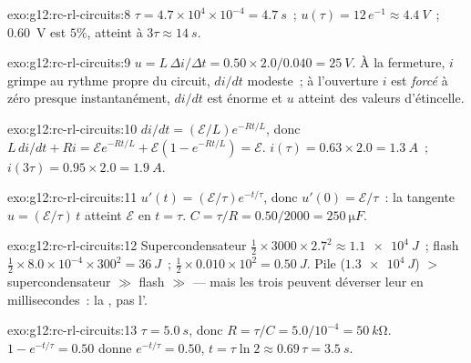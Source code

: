 \begin{solution}{exo:g12:rc-rl-circuits:8}
$\tau = 4.7\times10^{4} \times 10^{-4} = \qty{4.7}{s}$~;
$u(\tau) = 12\,e^{-1} \approx \qty{4.4}{V}$~; \qty{0.60}{V} est
$5\%$, atteint à $3\tau \approx \qty{14}{s}$.
\end{solution}

\begin{solution}{exo:g12:rc-rl-circuits:9}
$u = L\,\Delta i/\Delta t = 0.50 \times 2.0/0.040 = \qty{25}{V}$.
À la fermeture, $i$ grimpe au rythme propre du circuit, $di/dt$
modeste~; à l'ouverture $i$ est \emph{forcé} à zéro
presque instantanément, $di/dt$ est énorme et $u$ atteint des valeurs
d'étincelle.
\end{solution}

\begin{solution}{exo:g12:rc-rl-circuits:10}
$di/dt = (\mathcal{E}/L)e^{-Rt/L}$, donc $L\,di/dt + Ri =
\mathcal{E}e^{-Rt/L} + \mathcal{E}(1 - e^{-Rt/L}) = \mathcal{E}$.
$i(\tau) = 0.63 \times 2.0 = \qty{1.3}{A}$~;
$i(3\tau) = 0.95 \times 2.0 = \qty{1.9}{A}$.
\end{solution}

\begin{solution}{exo:g12:rc-rl-circuits:11}
$u'(t) = (\mathcal{E}/\tau)e^{-t/\tau}$, donc $u'(0) = \mathcal{E}/\tau$~:
la tangente $u = (\mathcal{E}/\tau)\,t$ atteint $\mathcal{E}$ en
$t = \tau$. $C = \tau/R = 0.50/2000 = \qty{250}{\micro F}$.
\end{solution}

\begin{solution}{exo:g12:rc-rl-circuits:12}
Supercondensateur $\tfrac12 \times 3000 \times 2.7^2 \approx
\qty{1.1e4}{J}$~; flash $\tfrac12 \times 8.0\times10^{-4} \times 300^2
= \qty{36}{J}$~;  $\tfrac12 \times 0.010 \times 10^2
= \qty{0.50}{J}$. Pile ($\qty{1.3e4}{J}$) $>$ supercondensateur $\gg$
flash $\gg$  --- mais les trois peuvent déverser
leur  en millisecondes~: la
, pas l'.
\end{solution}

\begin{solution}{exo:g12:rc-rl-circuits:13}
$\tau = \qty{5.0}{s}$, donc $R = \tau/C = 5.0/10^{-4} = \qty{50}{k\ohm}$.
$1 - e^{-t/\tau} = 0.50$ donne $e^{-t/\tau} = 0.50$, $t = \tau\ln 2
\approx 0.69\,\tau = \qty{3.5}{s}$.
\end{solution}

